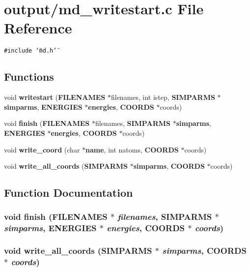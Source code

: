 \section{output/md\_\-writestart.c File Reference}
\label{md__writestart_8c}
{\tt \#include \char`\"{}md.h\char`\"{}}\par
\subsection*{Functions}
\begin{CompactItemize}
\item 
void {\bf writestart} ({\bf FILENAMES} $\ast$filenames, int istep, {\bf SIMPARMS} $\ast${\bf simparms}, {\bf ENERGIES} $\ast${\bf energies}, {\bf COORDS} $\ast$coords)
\item 
void {\bf finish} ({\bf FILENAMES} $\ast$filenames, {\bf SIMPARMS} $\ast${\bf simparms}, {\bf ENERGIES} $\ast${\bf energies}, {\bf COORDS} $\ast$coords)
\item 
void {\bf write\_\-coord} (char $\ast${\bf name}, int natoms, {\bf COORDS} $\ast$coords)
\item 
void {\bf write\_\-all\_\-coords} ({\bf SIMPARMS} $\ast${\bf simparms}, {\bf COORDS} $\ast$coords)
\end{CompactItemize}


\subsection{Function Documentation}
\subsubsection{\setlength{\rightskip}{0pt plus 5cm}void finish ({\bf FILENAMES} $\ast$ {\em filenames}, {\bf SIMPARMS} $\ast$ {\em simparms}, {\bf ENERGIES} $\ast$ {\em energies}, {\bf COORDS} $\ast$ {\em coords})}\label{md__writestart_8c_035649d57310d2f8da87ee62d54c9419}


\subsubsection{\setlength{\rightskip}{0pt plus 5cm}void write\_\-all\_\-coords ({\bf SIMPARMS} $\ast$ {\em simparms}, {\bf COORDS} $\ast$ {\em coords})}\label{md__writestart_8c_1ba9243dfdb2771405c4343aee2c4445}


